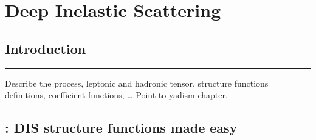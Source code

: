 
\chapter{Deep Inelastic Scattering}
\label{ch:dis}
\minitoc
\adjustmtc

\section{Introduction}
\label{sec/dis:intro}


\vspace*{20pt}
\noindent\rule{\hsize}{1pt}
Describe the process, leptonic and hadronic tensor, structure functions
definitions, coefficient functions, \dots
Point to yadism chapter.

\section{\yadism: DIS structure functions made easy}
\label{app/dis:yadism}


